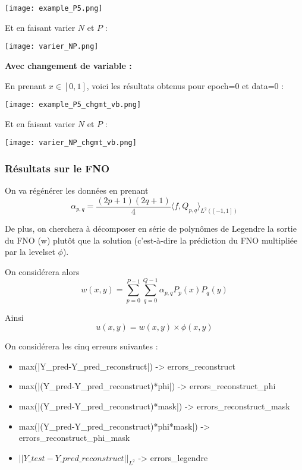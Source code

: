 \begin{minipage}{\linewidth}
	\centering
	\texttt{[image: example\_P5.png]}
\end{minipage}

Et en faisant varier $N$ et $P$ :

\begin{minipage}{\linewidth}
	\centering
	\texttt{[image: varier\_NP.png]}
\end{minipage}

\textbf{Avec changement de variable :}

En prenant $x\in[0,1]$, voici les résultats obtenus pour epoch=0 et data=0 :

\begin{minipage}{\linewidth}
	\centering
	\texttt{[image: example\_P5\_chgmt\_vb.png]}
\end{minipage}

Et en faisant varier $N$ et $P$ :

\begin{minipage}{\linewidth}
	\centering
	\texttt{[image: varier\_NP\_chgmt\_vb.png]}
\end{minipage}

\subsubsection{Résultats sur le FNO}

On va régénérer les données en prenant
$$\alpha_{p,q}=\frac{(2p+1)(2q+1)}{4}\langle f,Q_{p,q}\rangle_{L^2([-1,1])}$$

De plus, on cherchera à décomposer en série de polynômes de Legendre la sortie du FNO (w) plutôt que la solution (c'est-à-dire la prédiction du FNO multipliée par la levelset $\phi$).

On considérera alors
$$w(x,y)=\sum_{p=0}^{P-1}\sum_{q=0}^{Q-1}\alpha_{p,q}P_p(x)P_q(y)$$

Ainsi
$$u(x,y)=w(x,y)\times\phi(x,y)$$

On considérera les cinq erreurs suivantes :
\begin{itemize}
	\item max(|Y\_pred-Y\_pred\_reconstruct|) -> errors\_reconstruct
	\item max(|(Y\_pred-Y\_pred\_reconstruct)*phi|) -> errors\_reconstruct\_phi
	\item max(|(Y\_pred-Y\_pred\_reconstruct)*mask|) -> errors\_reconstruct\_mask
	\item max(|(Y\_pred-Y\_pred\_reconstruct)*phi*mask|) -> errors\_reconstruct\_phi\_mask
	\item $||Y\_test-Y\_pred\_reconstruct||_{L^2}$  -> errors\_legendre
\end{itemize}

